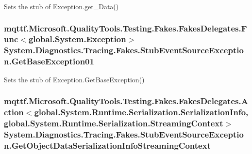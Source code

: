 Sets the stub of Exception.\-get\-\_\-\-Data()

\hypertarget{class_system_1_1_diagnostics_1_1_tracing_1_1_fakes_1_1_stub_event_source_exception_ab04ff0d4666af7964dd9308338762066}{
\subsubsection[{Get\-Base\-Exception01}]{\setlength{\rightskip}{0pt plus 5cm}mqttf.\-Microsoft.\-Quality\-Tools.\-Testing.\-Fakes.\-Fakes\-Delegates.\-Func$<$global.\-System.\-Exception$>$ System.\-Diagnostics.\-Tracing.\-Fakes.\-Stub\-Event\-Source\-Exception.\-Get\-Base\-Exception01}}\label{class_system_1_1_diagnostics_1_1_tracing_1_1_fakes_1_1_stub_event_source_exception_ab04ff0d4666af7964dd9308338762066}


Sets the stub of Exception.\-Get\-Base\-Exception()

\hypertarget{class_system_1_1_diagnostics_1_1_tracing_1_1_fakes_1_1_stub_event_source_exception_a16b251d6d7b6af83e7b95adbdfb10adc}{
\subsubsection[{Get\-Object\-Data\-Serialization\-Info\-Streaming\-Context}]{\setlength{\rightskip}{0pt plus 5cm}mqttf.\-Microsoft.\-Quality\-Tools.\-Testing.\-Fakes.\-Fakes\-Delegates.\-Action$<$global.\-System.\-Runtime.\-Serialization.\-Serialization\-Info, global.\-System.\-Runtime.\-Serialization.\-Streaming\-Context$>$ System.\-Diagnostics.\-Tracing.\-Fakes.\-Stub\-Event\-Source\-Exception.\-Get\-Object\-Data\-Serialization\-Info\-Streaming\-Context}}\label{class_system_1_1_diagnostics_1_1_tracing_1_1_fakes_1_1_stub_event_source_exception_a16b251d6d7b6af83e7b95adbdfb10adc}


